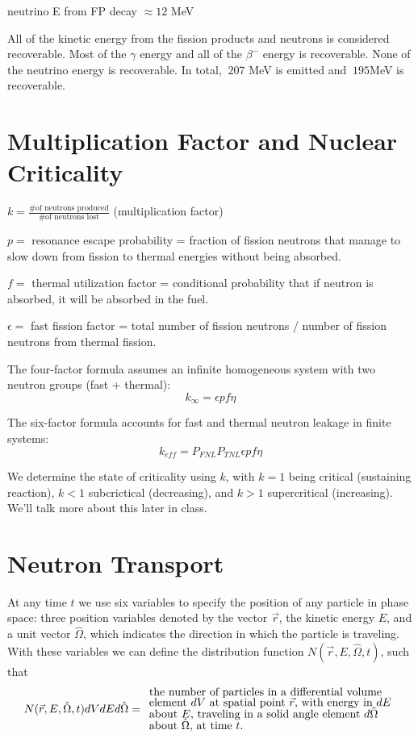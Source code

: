 \documentclass[12pt]{article}
\newcommand{\rvec}{\ensuremath{\vec{r}}}
\newcommand{\omvec}{\ensuremath{\hat{\Omega}}}
\begin{document}
neutrino E from FP decay $\approx 12$ MeV
\else
\vspace*{6 em}
\fi

All of the kinetic energy from the fission products and neutrons is considered recoverable. Most of the $\gamma$ energy and all of the $\beta^-$ energy is recoverable. None of the neutrino energy is recoverable. In total, $~207$ MeV is emitted and $~195$MeV is recoverable.

\section*{Multiplication Factor and Nuclear Criticality}

$k=\frac{\text{\# of neutrons produced}}{\text{\# of neutrons lost}}$ (multiplication factor)

$p=$ resonance escape probability = fraction of fission neutrons that manage to slow down from fission to thermal energies without being absorbed.

$f=$ thermal utilization factor = conditional probability that if neutron is absorbed, it will be absorbed in the fuel.

$\epsilon=$ fast fission factor = total number of fission neutrons / number of fission neutrons from thermal fission.

The four-factor formula assumes an infinite homogeneous system with two neutron groups (fast + thermal):
\[
k_{\infty}=\epsilon p f \eta
\]

The six-factor formula accounts for fast and thermal neutron leakage in finite systems:
\[
k_{eff} = P_{FNL}P_{TNL}\epsilon p f\eta
\]

We determine the state of criticality using $k$, with $k=1$ being critical (sustaining reaction), $k<1$ subcrictical (decreasing), and $k>1$ supercritical (increasing). We'll talk more about this later in class.

\section*{Neutron Transport}

At any time $t$ we use six variables to specify the
position of any particle in phase space: three position variables denoted by the vector $\rvec$,
the kinetic energy $E$, and a unit vector $\omvec$, which indicates the direction in which the
particle is traveling. With these variables we can define the distribution function
$N(\rvec,E,\omvec,t)$,
such that
\begin{align*}
N(\rvec,E,\omvec,t)dVdEd\omvec = \begin{array}{l}
\text{the number of particles in a differential volume}\vspace{-0.1 cm}\\
\text{element $dV$ at spatial point $\rvec$, with energy in $dE$}\vspace{-0.1 cm}\\
\text{about $E$, traveling in a solid angle element $d\omvec$}\vspace{-0.1 cm}\\
\text{about $\omvec$, at time $t$.}
\end{array}\label{nmbpart}
\end{align*} 
\end{document}
